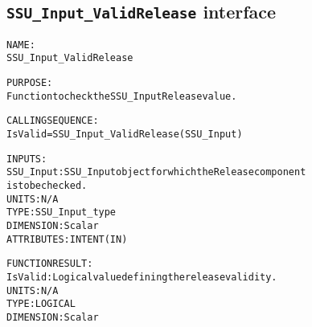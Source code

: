\subsection{\texttt{SSU\_Input\_ValidRelease} interface}
  \label{sec:SSU_Input_ValidRelease_interface}
  \begin{alltt}
 
  NAME:
        SSU_Input_ValidRelease
 
  PURPOSE:
        Function to check the SSU_Input Release value.
 
  CALLING SEQUENCE:
        IsValid = SSU_Input_ValidRelease( SSU_Input )
 
  INPUTS:
        SSU_Input:    SSU_Input object for which the Release component
                       is to be checked.
                       UNITS:      N/A
                       TYPE:       SSU_Input_type
                       DIMENSION:  Scalar
                       ATTRIBUTES: INTENT(IN)
 
  FUNCTION RESULT:
        IsValid:       Logical value defining the release validity.
                       UNITS:      N/A
                       TYPE:       LOGICAL
                       DIMENSION:  Scalar
 
  \end{alltt}
